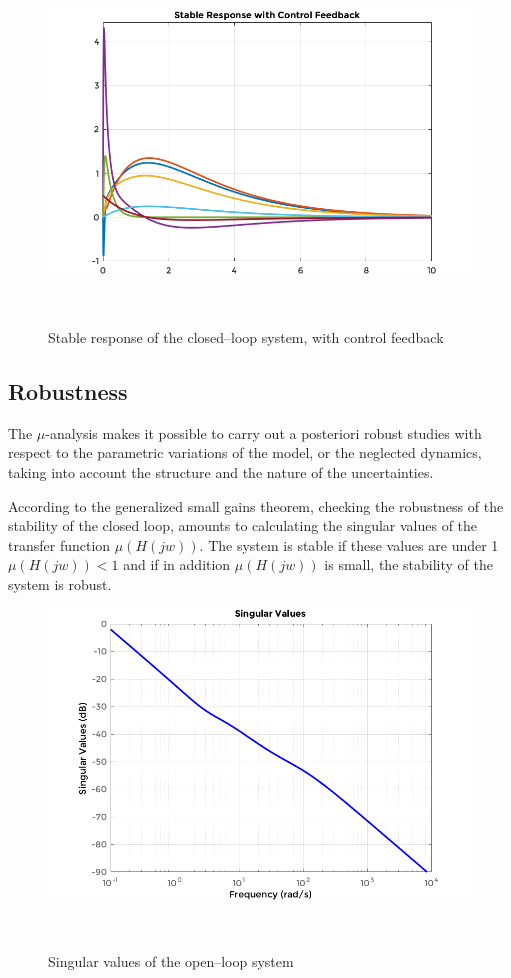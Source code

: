 \begin{figure}[!h]
	\includegraphics[width=1.15\linewidth]{figs/06/control/response_2}
	\caption{Stable response of the closed--loop system, with control feedback}
	\\[-5cm]
\end{figure}

\newpage
\subsection{Robustness}

The $\mu$-analysis makes it possible to carry out a posteriori robust studies with respect to the parametric variations of the model, or the neglected dynamics, taking into account the structure and the nature of the uncertainties.

According to the generalized small gains theorem, checking the robustness of the stability of the closed loop, amounts to calculating the singular values of the transfer function $\mu(H(jw))$. The system is stable if these values are under 1 $\mu(H(jw))<1$ and if in addition $\mu(H(jw))$ is small, the stability of the system is robust.

\begin{figure}[!h]
	\includegraphics[width=1\linewidth]{figs/06/control/singular_values_1}
	\caption{Singular values of the open--loop system}
	\\[-1cm]
\end{figure}

